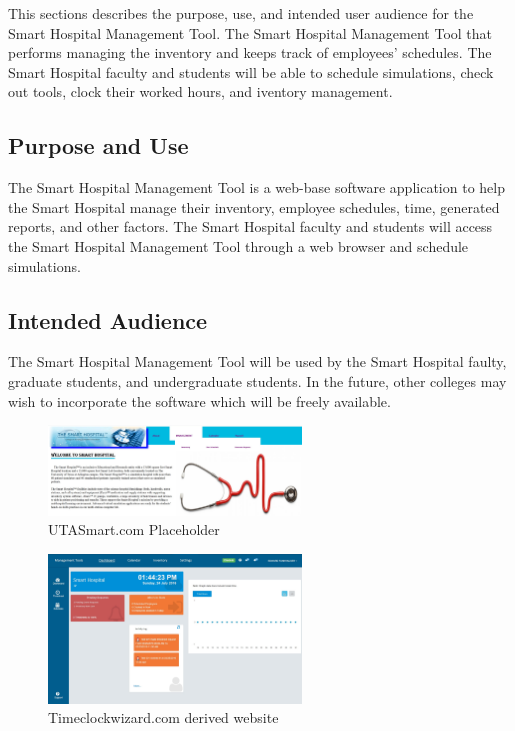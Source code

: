 This sections describes the purpose, use, and intended user audience for the Smart Hospital Management Tool. The Smart Hospital Management Tool that performs managing the inventory and keeps track of employees' schedules. The Smart Hospital faculty and students will be able to schedule simulations, check out tools, clock their worked hours, and iventory management.

\subsection{Purpose and Use}
The Smart Hospital Management Tool is a web-base software application to help the Smart Hospital manage their inventory, employee schedules, time, generated reports, and other factors. The Smart Hospital faculty and students will access the Smart Hospital Management Tool through a web browser and schedule simulations.

\subsection{Intended Audience}
The Smart Hospital Management Tool will be used by the Smart Hospital faulty, graduate students, and undergraduate students. In the future, other colleges may wish to incorporate the software which will be freely available.

\begin{figure}[h!]
	\centering
   	\includegraphics[width=0.60\textwidth]{images/concept_screenshot_1}
    \caption{UTASmart.com Placeholder}
\end{figure}

\begin{figure}[h!]
	\centering
   	\includegraphics[width=0.60\textwidth]{images/concept_timeclock_derive}
    \caption{Timeclockwizard.com derived website}
\end{figure}
